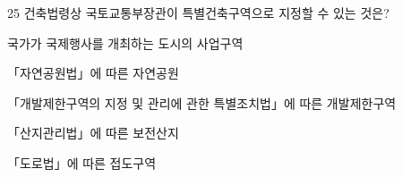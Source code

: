 \begin{question}{25}
건축법령상 국토교통부장관이 특별건축구역으로 지정할 수 있는 것은?
\begin{choices}
  \item 국가가 국제행사를 개최하는 도시의 사업구역
  \item 「자연공원법」에 따른 자연공원
  \item 「개발제한구역의 지정 및 관리에 관한 특별조치법」에 따른 개발제한구역
  \item 「산지관리법」에 따른 보전산지
  \item 「도로법」에 따른 접도구역
\end{choices}
\end{question}
